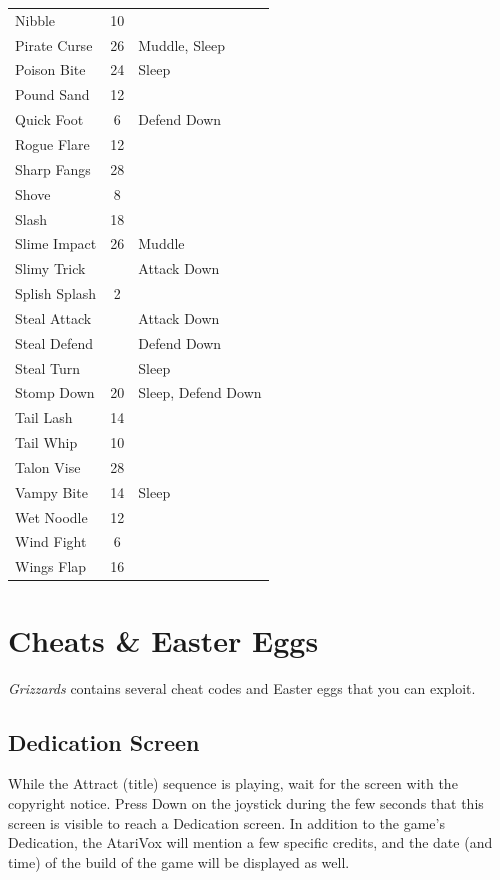 \documentclass[10pt,twocolumn]{memoir}
\begin{document}
\begin{tabular}{l c l}
             Nibble & 10 & \\
             Pirate Curse & 26 & Muddle, Sleep \\
             Poison Bite & 24 & Sleep \\
             Pound Sand & 12 & \\
             Quick Foot & 6 & Defend Down \\
             Rogue Flare & 12 & \\
             Sharp Fangs & 28 & \\
             Shove & 8 & \\
             Slash & 18 & \\
             Slime Impact & 26 & Muddle \\
             Slimy Trick & & Attack Down \\
             Splish Splash & 2 & \\
             Steal Attack & & Attack Down \\
             Steal Defend & & Defend Down \\
             Steal Turn & & Sleep \\
             Stomp Down & 20 & Sleep, Defend Down\\
             Tail Lash & 14 & \\
             Tail Whip & 10 & \\
             Talon Vise & 28 & \\
             Vampy Bite & 14 & Sleep \\
             Wet Noodle & 12 & \\
             Wind Fight & 6 & \\
             Wings Flap & 16 & \\
\end{tabular}

\chapter{Cheats \& Easter Eggs}

\textit{Grizzards} contains several cheat codes and Easter eggs that you
can exploit.

\section{Dedication Screen}

While the Attract (title) sequence is  playing, wait for the screen with
the copyright notice. Press Down on  the joystick during the few seconds
that this screen is visible to reach a Dedication screen. In addition to
the game's Dedication, the AtariVox will mention a few specific credits,
and the  date (and  time) of  the build  of the  game will  be displayed
as well.
\end{document}
